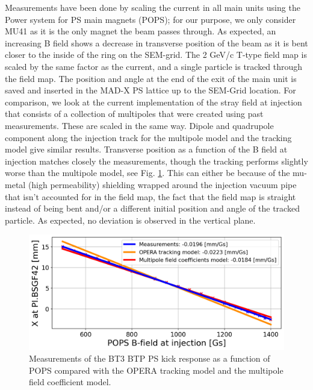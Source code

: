\documentclass[a4paper,
               biblatex,     %
               keeplastbox,   %
               ]{jacow}
\begin{document}
Measurements have been done by scaling the current in all main units using the Power system for PS main magnets (POPS); for our purpose, we only consider MU41 as it is the only magnet the beam passes through. As expected, an increasing B field shows a decrease in transverse position of the beam as it is bent closer to the inside of the ring on the SEM-grid. The 2 GeV/c T-type field map is scaled by the same factor as the current, and a single particle is tracked through the field map. The position and angle at the end of the exit of the main unit is saved and inserted in the MAD-X PS lattice up to the SEM-Grid location. For comparison, we look at the current implementation of the stray field at injection that consists of a collection of multipoles that were created using past measurements. These are scaled in the same way. Dipole and quadrupole component along the injection track for the multipole model and the tracking model give similar results. Transverse position as a function of the B field at injection matches closely the measurements, though the tracking performs slightly worse than the multipole model, see Fig. \ref{fig:injection_btp_transverse_position}. This can either be because of the mu-metal (high permeability) shielding wrapped around the injection vacuum pipe that isn't accounted for in the field map, the fact that the field map is straight instead of being bent and/or a different initial position and angle of the tracked particle. As expected, no deviation is observed in the vertical plane.

\begin{figure}[!htb]
   \centering
   \includegraphics*[width=1.0\columnwidth]{MOPOTK030_f6.png}
   \caption{Measurements of the BT3 BTP PS kick response as a function of POPS compared with the OPERA tracking model and the multipole field coefficient model.}
   \label{fig:injection_btp_transverse_position}
\end{figure}
\end{document}

